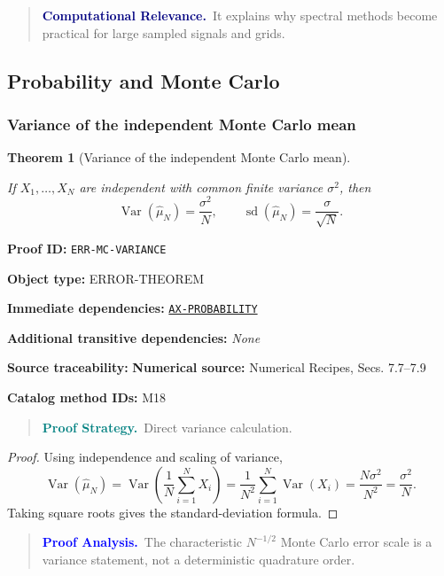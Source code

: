 \documentclass[10pt]{article}
\newcommand{\pidraw}[1]{\begingroup\urlstyle{tt}\nolinkurl{#1}\endgroup}
\newcommand{\pidref}[1]{\hyperref[prf:#1]{\pidraw{#1}}}
\newtheorem{theorem}{Theorem}[section]
\theoremstyle{definition}
\theoremstyle{remark}
\newenvironment{proofstrategy}
{\begin{quote}\small\noindent\textbf{\textcolor{teal}{Proof Strategy.}}\ }
{\end{quote}}
\newenvironment{proofanalysis}
{\begin{quote}\small\noindent\textbf{\textcolor{blue}{Proof Analysis.}}\ }
{\end{quote}}
\newenvironment{computationalrelevance}
{\begin{quote}\small\noindent\textbf{\textcolor{navy}{Computational Relevance.}}\ }
{\end{quote}}
\newcommand{\meta}[2]{\noindent\textbf{#1:} #2\par}
\begin{document}
\begin{computationalrelevance}It explains why spectral methods become practical for large sampled signals and grids.\end{computationalrelevance}

\subsection{Probability and Monte Carlo}

\subsubsection{Variance of the independent Monte Carlo mean}

\begin{theorem}[Variance of the independent Monte Carlo mean]\label{prf:ERR-MC-VARIANCE}

If $X_1,\ldots,X_N$ are independent with common finite variance $\sigma^2$, then
\[
\operatorname{Var}(\widehat\mu_N)=\frac{\sigma^2}{N},
\qquad
\operatorname{sd}(\widehat\mu_N)=\frac{\sigma}{\sqrt N}.
\]

\end{theorem}

\meta{Proof ID}{\pidraw{ERR-MC-VARIANCE}}
\meta{Object type}{ERROR-THEOREM}
\meta{Immediate dependencies}{\pidref{AX-PROBABILITY}}
\meta{Additional transitive dependencies}{\emph{None}}
\meta{Source traceability}{\textbf{Numerical source:} Numerical Recipes, Secs. 7.7--7.9}
\meta{Catalog method IDs}{M18}

\begin{proofstrategy}Direct variance calculation.\end{proofstrategy}

\begin{proof}

Using independence and scaling of variance,
\[
\operatorname{Var}(\widehat\mu_N)
=
\operatorname{Var}\left(\frac1N\sum_{i=1}^N X_i\right)
=
\frac1{N^2}\sum_{i=1}^N\operatorname{Var}(X_i)
=
\frac{N\sigma^2}{N^2}
=
\frac{\sigma^2}{N}.
\]
Taking square roots gives the standard-deviation formula.

\end{proof}

\begin{proofanalysis}The characteristic $N^{-1/2}$ Monte Carlo error scale is a variance statement, not a deterministic quadrature order.\end{proofanalysis}
\end{document}
